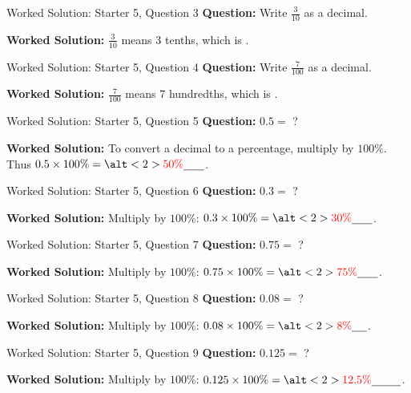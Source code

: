 \documentclass{beamer}
\newcommand{\ablank}[1]{%
  \alt<2>{\textcolor{red}{#1}}{\underline{\phantom{#1}}}%
}
\begin{document}
\begin{frame}[t]{Worked Solution: Starter 5, Question 3}
\textbf{Question:} Write \(\frac{3}{10}\) as a decimal.

\smallskip
\textbf{Worked Solution:} \(\frac{3}{10}\) means \(3\) tenths, which is \ablank{$0.3$}.
\end{frame}

\begin{frame}[t]{Worked Solution: Starter 5, Question 4}
\textbf{Question:} Write \(\frac{7}{100}\) as a decimal.

\smallskip
\textbf{Worked Solution:} \(\frac{7}{100}\) means \(7\) hundredths, which is \ablank{$0.07$}.
\end{frame}

\begin{frame}[t]{Worked Solution: Starter 5, Question 5}
\textbf{Question:} \(0.5 =\) ?

\smallskip
\textbf{Worked Solution:} To convert a decimal to a percentage, multiply by \(100\%\). Thus \(0.5 \times 100\% = \ablank{50\%}\).
\end{frame}

\begin{frame}[t]{Worked Solution: Starter 5, Question 6}
\textbf{Question:} \(0.3 =\) ?

\smallskip
\textbf{Worked Solution:} Multiply by \(100\%\): \(0.3 \times 100\% = \ablank{30\%}\).
\end{frame}

\begin{frame}[t]{Worked Solution: Starter 5, Question 7}
\textbf{Question:} \(0.75 =\) ?

\smallskip
\textbf{Worked Solution:} Multiply by \(100\%\): \(0.75 \times 100\% = \ablank{75\%}\).
\end{frame}

\begin{frame}[t]{Worked Solution: Starter 5, Question 8}
\textbf{Question:} \(0.08 =\) ?

\smallskip
\textbf{Worked Solution:} Multiply by \(100\%\): \(0.08 \times 100\% = \ablank{8\%}\).
\end{frame}

\begin{frame}[t]{Worked Solution: Starter 5, Question 9}
\textbf{Question:} \(0.125 =\) ?

\smallskip
\textbf{Worked Solution:} Multiply by \(100\%\): \(0.125 \times 100\% = \ablank{12.5\%}\).
\end{frame}
\end{document}
